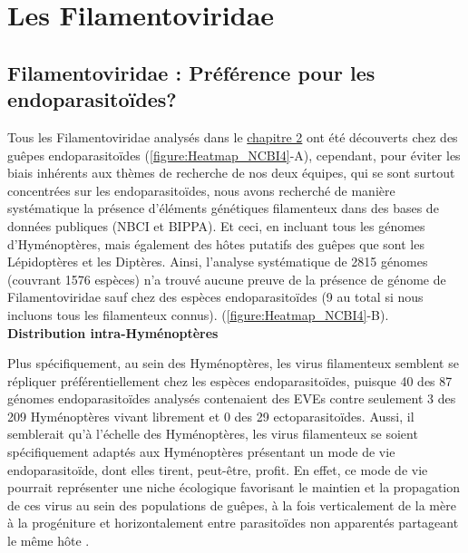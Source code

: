 \section{Les Filamentoviridae}

\subsection{Filamentoviridae : Préférence pour les endoparasitoïdes?}

Tous les Filamentoviridae analysés dans le \hyperref[sec:chap2]{chapitre 2} ont été découverts chez des guêpes endoparasitoïdes (\figurename{\ref{figure:Heatmap_NCBI4}}-A), cependant, pour éviter les biais inhérents aux thèmes de recherche de nos deux équipes, qui se sont surtout concentrées sur les endoparasitoïdes, nous avons recherché de manière systématique la présence d'éléments génétiques filamenteux dans des bases de données publiques (NBCI et BIPPA). Et ceci, en incluant tous les génomes d'Hyménoptères, mais également des hôtes putatifs des guêpes que sont les Lépidoptères et les Diptères. Ainsi, l'analyse systématique de 2815 génomes (couvrant 1576 espèces) n'a trouvé aucune preuve de la présence de génome de Filamentoviridae sauf chez des espèces endoparasitoïdes (9 au total si nous incluons tous les filamenteux connus). (\figurename{\ref{figure:Heatmap_NCBI4}}-B). \\

\textbf{Distribution intra-Hyménoptères}

Plus spécifiquement, au sein des Hyménoptères, les virus filamenteux semblent se répliquer préférentiellement chez les espèces endoparasitoïdes, puisque 40 des 87 génomes endoparasitoïdes analysés contenaient des EVEs contre seulement 3 des 209 Hyménoptères vivant librement et 0 des 29 ectoparasitoïdes. Aussi, il semblerait qu'à l'échelle des Hyménoptères, les virus filamenteux se soient spécifiquement adaptés aux Hyménoptères présentant un mode de vie endoparasitoïde, dont elles tirent, peut-être, profit. En effet, ce mode de vie pourrait représenter une niche écologique favorisant le maintien et la propagation de ces virus au sein des populations de guêpes, à la fois verticalement de la mère à la progéniture \citep{martinez_additional_2016, coffman_viral_2022} et horizontalement entre parasitoïdes non apparentés partageant le même hôte \citep{varaldi_infectious_2003,stasiak_characteristics_2005}.\\

